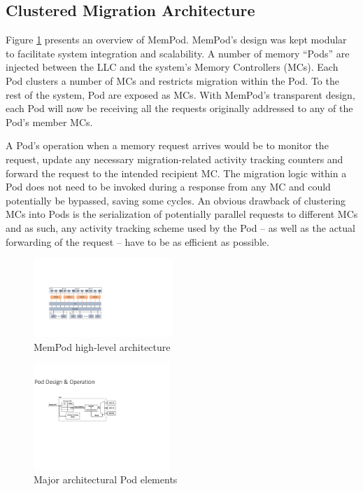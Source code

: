 \subsection{Clustered Migration Architecture}

 Figure \ref{fig:architecture_complete} presents an overview of MemPod. MemPod's design was kept modular to facilitate system integration and scalability. A number of memory ``Pods'' are injected between the LLC and the system's Memory Controllers (MCs). Each Pod clusters a number of MCs and restricts migration  within the Pod. To the rest of the system, Pod are exposed as MCs. With MemPod's transparent design, each Pod will now be receiving all the requests originally addressed to any of the Pod's member MCs. 

A Pod's operation when a memory request arrives would be to monitor the request, update any necessary migration-related activity tracking counters and forward the request to the intended recipient MC. The migration logic within a Pod does not need to be invoked during a response from any MC and could potentially be bypassed, saving some cycles. An obvious drawback of clustering MCs into Pods is the serialization of potentially parallel requests to different MCs and as such, any activity tracking scheme used by the Pod -- as well as the actual forwarding of the request -- have to be as efficient as possible. 

\begin{figure}[h]
  \includegraphics[width=0.47\textwidth]{figures/mempod_org.pdf}
  \caption{MemPod high-level architecture}
  \label{fig:architecture_complete}
\end{figure}

\begin{figure}[h]
  \includegraphics[width=0.46\textwidth]{figures/pod_design.pdf}
  \caption{Major architectural Pod elements}
  \label{fig:architecture_pod}
\end{figure}

